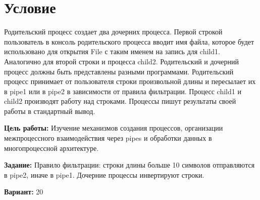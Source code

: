 \section{Условие}
Родительский процесс создает два дочерних процесса. Первой строкой пользователь в консоль
родительского процесса вводит имя файла, которое будет использовано для открытия File с таким
именем на запись для child1. Аналогично для второй строки и процесса child2. Родительский 
и
дочерний процесс должны быть представлены разными программами. Родительский процесс принимает от пользователя строки произвольной длины и пересылает их в
pipe1 или в pipe2 в зависимости от правила фильтрации. Процесс child1 и child2 производят работу
над строками. Процессы пишут результаты своей работы в стандартный вывод. 

{\bfseries Цель работы:}
Изучение механизмов создания процессов, организации межпроцессного взаимодействия через pipes и обработки данных в многопроцессной архитектуре.

{\bfseries Задание:}
 Правило фильтрации: строки длины больше 10 символов отправляются в pipe2, иначе
в pipe1. Дочерние процессы инвертируют строки.

{\bfseries Вариант:} 20



